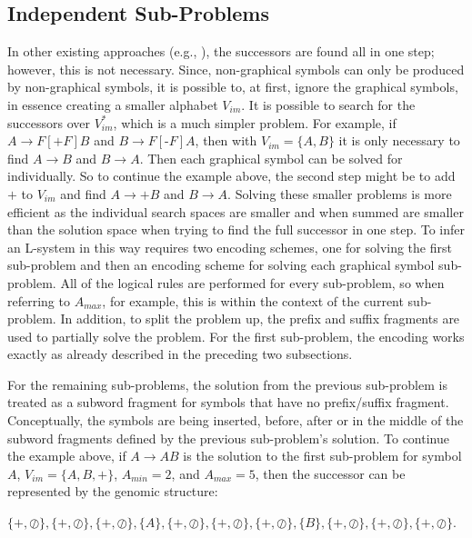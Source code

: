\documentclass{llncs}
\begin{document}
	\subsection{Independent Sub-Problems}
	
	In other existing approaches (e.g., \cite{nakano_inferD0Lerrorfree,runqiang_inferGA,mock_wildwood}), the successors are found all in one step; however, this is not necessary. Since, non-graphical symbols can only be produced by non-graphical symbols, it is possible to, at first, ignore the graphical symbols, in essence creating a smaller alphabet $V_{im}$. It is possible to search for the successors over $V_{im}^{*}$, which is a much simpler problem. For example, if $A \to F[\text{+}F]B$ and $B \to F[\text{-}F]A$, then with $V_{im} = \{A,B\}$ it is only necessary to find $A \to B$ and $B \to A$. Then each graphical symbol can be solved for individually. So to continue the example above, the second step might be to add $+$ to $V_{im}$ and find $A \to +B$ and $B \to A$. Solving these smaller problems is more efficient as the individual search spaces are smaller and when summed are smaller than the solution space when trying to find the full successor in one step. To infer an L-system in this way requires two encoding schemes, one for solving the first sub-problem and then an encoding scheme for solving each graphical symbol sub-problem. All of the logical rules are performed for every sub-problem, so when referring to $A_{max}$, for example, this is within the context of the current sub-problem. In addition, to split the problem up, the prefix and suffix fragments are used to partially solve the problem. For the first sub-problem, the encoding works exactly as already described in the preceding two subsections. 
	
	For the remaining sub-problems, the solution from the previous sub-problem is treated as a subword fragment for symbols that have no prefix/suffix fragment. Conceptually, the symbols are being inserted, before, after or in the middle of the subword fragments defined by the previous sub-problem's solution. To continue the example above, if $A \to AB$ is the solution to the first sub-problem for symbol $A$, $V_{im} = \{A,B,\text{+}\}$, $A_{min} = 2$, and $A_{max} = 5$, then the successor can be represented by the genomic structure:
	
	\begin{center}
		$\{\text{+},\oslash\},\{\text{+},\oslash\},\{\text{+},\oslash\},\{A\},\{\text{+},\oslash\},\{\text{+},\oslash\},\{\text{+},\oslash\},\{B\},\{\text{+},\oslash\},\{\text{+},\oslash\},\{\text{+},\oslash\}$.
	\end{center}
	
\end{document}
